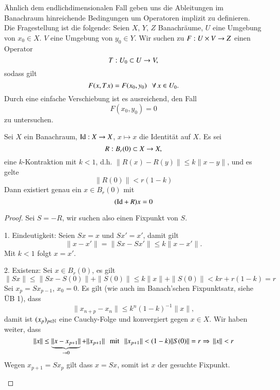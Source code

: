 Ähnlich dem endlichdimensionalen Fall geben uns die Ableitungen im Banachraum
hinreichende Bedingungen um Operatoren implizit zu definieren. Die Fragestellung ist die folgende:
Seien $X,\, Y,\, Z$ Banachräume, $U$ eine Umgebung von $x_0\in X$. $V$ eine Umgebung von $y_0\in Y$.
Wir suchen zu $F:U\times V \rightarrow Z$ einen Operator
\[
    T:U_0\subset U \rightarrow V, 
\]
sodass gilt
\[
    F(x,Tx)=F(x_0,y_0) \hspace{.25cm} \forall \, x\in U_0.
\]
Durch eine einfache Verschiebung ist es ausreichend, den Fall
\[
    F(x_0,y_0)=0
\]
zu untersuchen.

\begin{prop}\label{1.11}
    Sei $X$ ein Banachraum, $\mathrm{Id}: X\rightarrow X$, $x\mapsto x$ die Identität auf $X$. Es sei
    \[
        R:B_r(0)\subset X \rightarrow X, 
    \]
    eine $k$-Kontraktion mit $k<1$, d.h. $\|R(x)-R(y)\|\leq k \|x-y\|$, und es gelte
    \[
        \|R(0)\| < r(1-k)
    \]
    Dann existiert genau ein $x\in B_r(0)$ mit
    \[
        (\mathrm{Id} + R)x = 0
    \]
\end{prop}

\begin{proof}
    Sei $S=-R$, wir suchen also einen Fixpunkt von $S$.
    \begin{description}
        \item{1. Eindeutigkeit:} 
        Seien $Sx=x$ und $Sx'=x'$, damit gilt
        \[
            \|x-x'\|=\|Sx-Sx'\| \leq k \|x-x'\|.
        \]
        Mit $k<1$ folgt $x=x'$.
        
        \item{2. Existenz:}
        Sei $x\in B_r(0)$, es gilt
        \[
            \|Sx\|\leq \|Sx-S(0)\|+\|S(0)\|\leq k\|x\|+\|S(0)\|< kr + r(1-k) = r
        \]
        Sei $x_p=Sx_{p-1}$, $x_0=0$. Es gilt (wie auch im Banach'schen Fixpunktsatz, siehe ÜB 1), dass
        \[
            \|x_{n+p}-x_n\| \leq k^n(1-k)^{-1}\|x\|,
        \]
        damit ist $(x_p)_{p\in \mathbb{N}}$ eine Cauchy-Folge und konvergiert gegen $x\in X$.
        Wir haben weiter, dass
        \[
            \|x\| \leq \underbrace{\|x-x_{p+1}\|}_{\rightarrow 0} + \|x_{p+1}\| \hspace{.25cm} \text{mit} 
            \hspace{.25cm} \|x_{p+1}\|< (1-k) \|S(0)\|=r\\
            \Rightarrow \, \|x\|<r
        \]
        Wegen $x_{p+1}=Sx_p$ gilt dass $x=Sx$, somit ist $x$ der gesuchte Fixpunkt. 
    \end{description}
    \[  \]
\end{proof}

